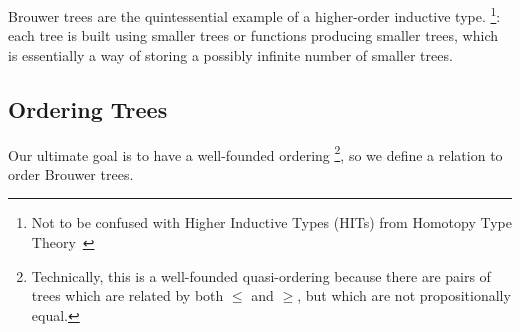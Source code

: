 Brouwer trees are the quintessential example of a higher-order inductive type.%
\footnote{Not to be confused with Higher Inductive Types (HITs) from Homotopy Type Theory~\citep{hottbook}}:
each tree is built using smaller trees or functions producing smaller trees, which is essentially
a way of storing a possibly infinite number of smaller trees.

\subsection{Ordering Trees}

Our ultimate goal is to have a well-founded ordering%
\footnote{Technically, this is a well-founded quasi-ordering because there are pairs of
  trees which are related by both $\leq$ and $\geq$, but which are not propositionally equal.},
so we define a relation to order Brouwer trees.

